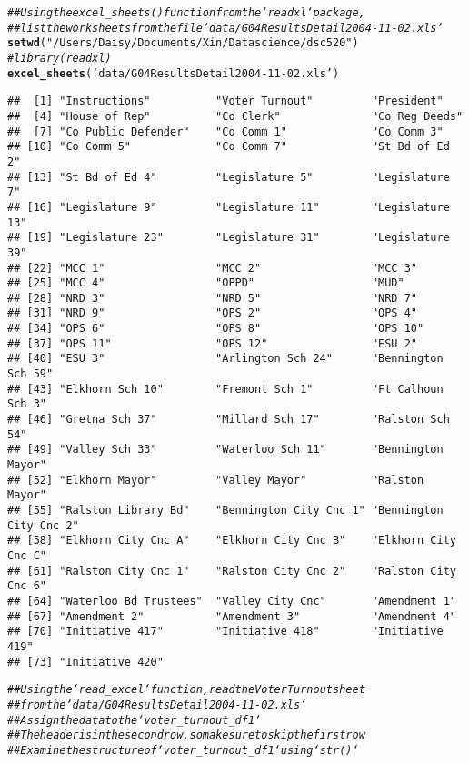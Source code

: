 \documentclass{article}\usepackage[]{graphicx}\usepackage[]{xcolor}
\makeatletter
\newcommand{\hlstr}[1]{\textcolor[rgb]{0.192,0.494,0.8}{#1}}%
\newcommand{\hlcom}[1]{\textcolor[rgb]{0.678,0.584,0.686}{\textit{#1}}}%
\newcommand{\hlstd}[1]{\textcolor[rgb]{0.345,0.345,0.345}{#1}}%
\newcommand{\hlkwd}[1]{\textcolor[rgb]{0.737,0.353,0.396}{\textbf{#1}}}%
\newenvironment{kframe}{%
 \def\at@end@of@kframe{}%
 \ifinner\ifhmode%
  \def\at@end@of@kframe{\end{minipage}}%
  \begin{minipage}{\columnwidth}%
 \fi\fi%
 \def\FrameCommand##1{\hskip\@totalleftmargin \hskip-\fboxsep
 \colorbox{shadecolor}{##1}\hskip-\fboxsep
     \hskip-\linewidth \hskip-\@totalleftmargin \hskip\columnwidth}%
 \MakeFramed {\advance\hsize-\width
   \@totalleftmargin\z@ \linewidth\hsize
   \@setminipage}}%
 {\par\unskip\endMakeFramed%
 \at@end@of@kframe}
\newenvironment{knitrout}{}{} %
\makeatother
\begin{document}
\begin{knitrout}
\begin{kframe}
\begin{alltt}
\hlcom{## Using the excel_sheets() function from the `readxl` package,}
\hlcom{## list the worksheets from the file `data/G04ResultsDetail2004-11-02.xls`}
\hlkwd{setwd}\hlstd{(}\hlstr{"/Users/Daisy/Documents/Xin/Data science/dsc520"}\hlstd{)}
\hlcom{#library(readxl)}
\hlkwd{excel_sheets}\hlstd{(}\hlstr{'data/G04ResultsDetail2004-11-02.xls'}\hlstd{)}
\end{alltt}
\begin{verbatim}
##  [1] "Instructions"          "Voter Turnout"         "President"            
##  [4] "House of Rep"          "Co Clerk"              "Co Reg Deeds"         
##  [7] "Co Public Defender"    "Co Comm 1"             "Co Comm 3"            
## [10] "Co Comm 5"             "Co Comm 7"             "St Bd of Ed 2"        
## [13] "St Bd of Ed 4"         "Legislature 5"         "Legislature 7"        
## [16] "Legislature 9"         "Legislature 11"        "Legislature 13"       
## [19] "Legislature 23"        "Legislature 31"        "Legislature 39"       
## [22] "MCC 1"                 "MCC 2"                 "MCC 3"                
## [25] "MCC 4"                 "OPPD"                  "MUD"                  
## [28] "NRD 3"                 "NRD 5"                 "NRD 7"                
## [31] "NRD 9"                 "OPS 2"                 "OPS 4"                
## [34] "OPS 6"                 "OPS 8"                 "OPS 10"               
## [37] "OPS 11"                "OPS 12"                "ESU 2"                
## [40] "ESU 3"                 "Arlington Sch 24"      "Bennington Sch 59"    
## [43] "Elkhorn Sch 10"        "Fremont Sch 1"         "Ft Calhoun Sch 3"     
## [46] "Gretna Sch 37"         "Millard Sch 17"        "Ralston Sch 54"       
## [49] "Valley Sch 33"         "Waterloo Sch 11"       "Bennington Mayor"     
## [52] "Elkhorn Mayor"         "Valley Mayor"          "Ralston Mayor"        
## [55] "Ralston Library Bd"    "Bennington City Cnc 1" "Bennington City Cnc 2"
## [58] "Elkhorn City Cnc A"    "Elkhorn City Cnc B"    "Elkhorn City Cnc C"   
## [61] "Ralston City Cnc 1"    "Ralston City Cnc 2"    "Ralston City Cnc 6"   
## [64] "Waterloo Bd Trustees"  "Valley City Cnc"       "Amendment 1"          
## [67] "Amendment 2"           "Amendment 3"           "Amendment 4"          
## [70] "Initiative 417"        "Initiative 418"        "Initiative 419"       
## [73] "Initiative 420"
\end{verbatim}
\begin{alltt}
\hlcom{## Using the `read_excel` function, read the Voter Turnout sheet}
\hlcom{## from the `data/G04ResultsDetail2004-11-02.xls`}
\hlcom{## Assign the data to the `voter_turnout_df1`}
\hlcom{## The header is in the second row, so make sure to skip the first row}
\hlcom{## Examine the structure of `voter_turnout_df1` using `str()`}


\end{alltt}
\end{kframe}
\end{knitrout}
\end{document}
